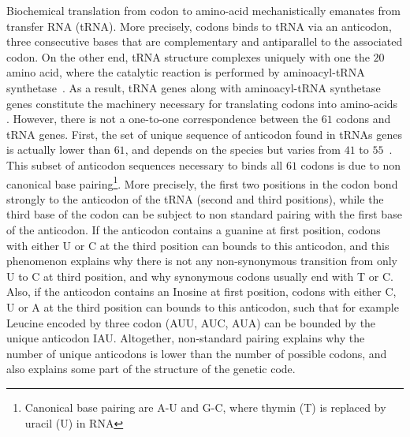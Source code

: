 Biochemical translation from \gls{codon} to amino-acid mechanistically emanates from transfer \acrshort{RNA} (\acrshort{tRNA}).
More precisely, \glspl{codon} binds to \acrshort{tRNA} via an anticodon, three consecutive bases that are complementary and antiparallel to the associated \gls{codon}.
On the other end, \acrshort{tRNA} structure complexes uniquely with one the $20$ amino acid, where the catalytic reaction is performed by aminoacyl-tRNA synthetase~\citep{Rich1976}.
As a result, \acrshort{tRNA} genes along with aminoacyl-tRNA synthetase genes constitute the machinery necessary for translating \glspl{codon} into amino-acids .
However, there is not a one-to-one correspondence between the $61$ \glspl{codon} and \acrshort{tRNA} genes.
First, the set of unique sequence of anticodon found in tRNAs genes is actually lower than $61$, and depends on the species but varies from $41$ to $55$~\citep{Goodenbour2006}.
This subset of anticodon sequences necessary to binds all $61$ \glspl{codon} is due to non canonical base pairing\footnote{Canonical base pairing are A-U and G-C, where thymin (T) is replaced by uracil (U) in RNA}.
More precisely, the first two positions in the \gls{codon} bond strongly to the anticodon of the \acrshort{tRNA} (second and third positions), while the third base of the \gls{codon} can be subject to non standard pairing with the first base of the anticodon.
If the anticodon contains a guanine at first position, \glspl{codon} with either U or C at the third position can bounds to this anticodon, and this phenomenon explains why there is not any non-synonymous {transition} from only U to C at third position, and why synonymous \glspl{codon} usually end with T or C.
Also, if the anticodon contains an Inosine at first position, \glspl{codon} with either C, U or A at the third position can bounds to this anticodon, such that for example Leucine encoded by three \gls{codon} (AUU, AUC, AUA) can be bounded by the unique anticodon IAU.
Altogether, non-standard pairing explains why the number of unique anticodons is lower than the number of possible \glspl{codon}, and also explains some part of the structure of the genetic code.

